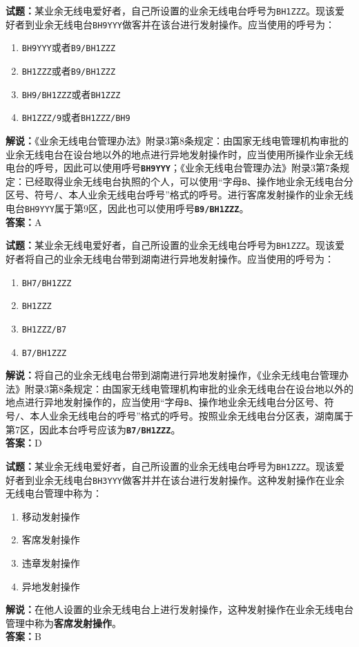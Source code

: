\documentclass{ctexbook}
\begin{document}
\bigskip

\noindent\textbf{试题：}某业余无线电爱好者，自己所设置的业余无线电台呼号为\texttt{BH1ZZZ}。现该爱好者到业余无线电台\texttt{BH9YYY}做客并在该台进行发射操作。应当使用的呼号为：
\begin{enumerate}[leftmargin=3em]
  \item \texttt{BH9YYY}或者\texttt{B9/BH1ZZZ}
  \item \texttt{BH1ZZZ}或者\texttt{B9/BH1ZZZ}
  \item \texttt{BH9/BH1ZZZ}或者\texttt{BH1ZZZ}
  \item \texttt{BH1ZZZ/9}或者\texttt{BH1ZZZ/BH9}
\end{enumerate}
\noindent\textbf{解说：}《业余无线电台管理办法》附录3第8条规定：由国家无线电管理机构审批的业余无线电台在设台地以外的地点进行异地发射操作时，应当使用所操作业余无线电台的呼号，因此可以使用呼号\texttt{\textbf{BH9YYY}}；《业余无线电台管理办法》附录3第7条规定：已经取得业余无线电台执照的个人，可以使用“字母\texttt{B}、操作地业余无线电台分区号、符号\texttt{/}、本人业余无线电台呼号”格式的呼号。进行客席发射操作的业余无线电台\texttt{BH9YYY}属于第9区，因此也可以使用呼号\texttt{\textbf{B9/BH1ZZZ}}。\\\noindent\textbf{答案：}A

\bigskip

\noindent\textbf{试题：}某业余无线电爱好者，自己所设置的业余无线电台呼号为\texttt{BH1ZZZ}。现该爱好者将自己的业余无线电台带到湖南进行异地发射操作。应当使用的呼号为：
\begin{enumerate}[leftmargin=3em]
  \item \texttt{BH7/BH1ZZZ}
  \item \texttt{BH1ZZZ}
  \item \texttt{BH1ZZZ/B7}
  \item \texttt{B7/BH1ZZZ}
\end{enumerate}
\noindent\textbf{解说：}将自己的业余无线电台带到湖南进行异地发射操作，《业余无线电台管理办法》附录3第8条规定：由国家无线电管理机构审批的业余无线电台在设台地以外的地点进行异地发射操作的，应当使用“字母\texttt{B}、操作地业余无线电台分区号、符号\texttt{/}、本人业余无线电台的呼号”格式的呼号。按照业余无线电台分区表，湖南属于第7区，因此本台呼号应该为\texttt{\textbf{B7/BH1ZZZ}}。\\\noindent\textbf{答案：}D

\bigskip

\noindent\textbf{试题：}某业余无线电爱好者，自己所设置的业余无线电台呼号为\texttt{BH1ZZZ}。现该爱好者到业余无线电台\texttt{BH3YYY}做客并并在该台进行发射操作。这种发射操作在业余无线电台管理中称为：
\begin{enumerate}[leftmargin=3em]
  \item 移动发射操作
  \item 客席发射操作
  \item 违章发射操作
  \item 异地发射操作
\end{enumerate}
\noindent\textbf{解说：}在他人设置的业余无线电台上进行发射操作，这种发射操作在业余无线电台管理中称为\textbf{客席发射操作}。\\
\noindent\textbf{答案：}B
\end{document}
